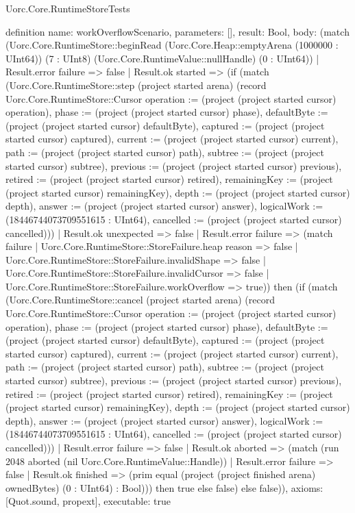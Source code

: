 \begin{lexlean}{Uorc.Core.RuntimeStoreTests}
\begin{semanticmodule}
definition{
  name: workOverflowScenario,
  parameters: [],
  result: Bool,
  body: (match (Uorc.Core.RuntimeStore::beginRead (Uorc.Core.Heap::emptyArena (1000000 : UInt64)) (7 : UInt8) (Uorc.Core.RuntimeValue::nullHandle) (0 : UInt64))
    | Result.error failure => false
    | Result.ok started => (if (match (Uorc.Core.RuntimeStore::step (project started arena) (record Uorc.Core.RuntimeStore::Cursor {operation := (project (project started cursor) operation), phase := (project (project started cursor) phase), defaultByte := (project (project started cursor) defaultByte), captured := (project (project started cursor) captured), current := (project (project started cursor) current), path := (project (project started cursor) path), subtree := (project (project started cursor) subtree), previous := (project (project started cursor) previous), retired := (project (project started cursor) retired), remainingKey := (project (project started cursor) remainingKey), depth := (project (project started cursor) depth), answer := (project (project started cursor) answer), logicalWork := (18446744073709551615 : UInt64), cancelled := (project (project started cursor) cancelled)}))
      | Result.ok unexpected => false
      | Result.error failure => (match failure
        | Uorc.Core.RuntimeStore::StoreFailure.heap reason => false
        | Uorc.Core.RuntimeStore::StoreFailure.invalidShape => false
        | Uorc.Core.RuntimeStore::StoreFailure.invalidCursor => false
        | Uorc.Core.RuntimeStore::StoreFailure.workOverflow => true)) then (if (match (Uorc.Core.RuntimeStore::cancel (project started arena) (record Uorc.Core.RuntimeStore::Cursor {operation := (project (project started cursor) operation), phase := (project (project started cursor) phase), defaultByte := (project (project started cursor) defaultByte), captured := (project (project started cursor) captured), current := (project (project started cursor) current), path := (project (project started cursor) path), subtree := (project (project started cursor) subtree), previous := (project (project started cursor) previous), retired := (project (project started cursor) retired), remainingKey := (project (project started cursor) remainingKey), depth := (project (project started cursor) depth), answer := (project (project started cursor) answer), logicalWork := (18446744073709551615 : UInt64), cancelled := (project (project started cursor) cancelled)}))
      | Result.error failure => false
      | Result.ok aborted => (match (run 2048 aborted (nil Uorc.Core.RuntimeValue::Handle))
        | Result.error failure => false
        | Result.ok finished => (prim equal (project (project finished arena) ownedBytes) (0 : UInt64) : Bool))) then true else false) else false)),
  axioms: [Quot.sound, propext],
  executable: true
}


\end{semanticmodule}
\end{lexlean}
